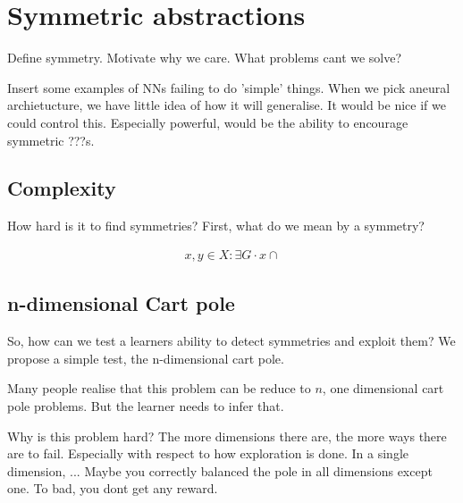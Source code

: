 \section{Symmetric abstractions}

Define symmetry. Motivate why we care. What problems cant we solve?

Insert some examples of NNs failing to do 'simple' things.
When we pick aneural archietucture, we have little idea of how it will generalise.
It would be nice if we could control this.
Especially powerful, would be the ability to encourage symmetric ???s.


\subsection{Complexity}

How hard is it to find symmetries?
First, what do we mean by a symmetry?

\begin{align}
x, y \in X : \exists G \cdot x \cap
\end{align}



\subsection{n-dimensional Cart pole}

So, how can we test a learners ability to detect symmetries and exploit them?
We propose a simple test, the n-dimensional cart pole.

Many people realise that this problem can be reduce to $n$, one dimensional cart pole problems.
But the learner needs to infer that.

\cite{Brockman2016,baselines}

Why is this problem hard? The more dimensions there are, the more ways there are to fail.
Especially with respect to how exploration is done. In a single dimension, ...
Maybe you correctly balanced the pole in all dimensions except one. To bad, you dont get any reward.

